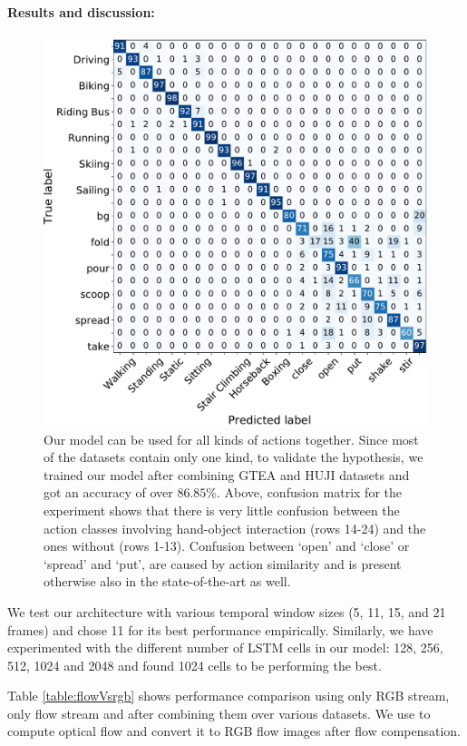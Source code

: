 \documentclass{article}
\begin{document}
\paragraph*{Results and discussion:}

\begin{figure}[t]
\includegraphics[width=0.95\linewidth]{cm}
\caption{Our model can be used for all kinds of actions together. Since most of the datasets contain only one kind, to validate the hypothesis, we trained our model after combining GTEA and HUJI datasets and got an accuracy of over $86.85\%$. Above, confusion matrix for the experiment shows that there is very little confusion between the action classes involving hand-object interaction (rows 14-24) and the ones without (rows 1-13). Confusion between `open' and `close' or `spread' and `put', are caused by action similarity and is present otherwise also in the state-of-the-art as well.}
\label{fig:mixed-actions}
\end{figure}
\renewcommand{\tabcolsep}{0.05cm}

We test our architecture with various temporal window sizes (5, 11, 15, and 21 frames) and chose 11 for its best performance empirically. Similarly, we have experimented with the different number of LSTM cells in our model: 128, 256, 512, 1024 and 2048 and found 1024 cells to be performing the best.

Table \ref{table:flowVsrgb} shows performance comparison using only RGB stream, only flow stream and after combining them over various datasets. We use \cite{liu2009beyond} to compute optical flow and convert it to RGB flow images \cite{baker2011database} after flow compensation. %
\end{document}
